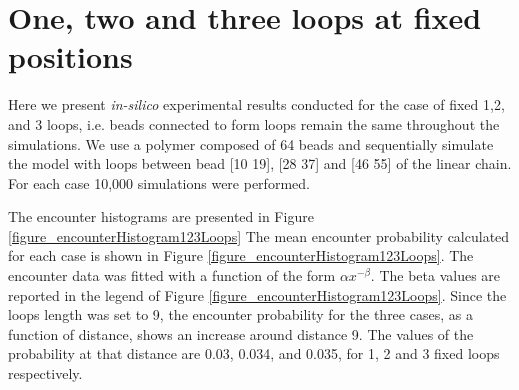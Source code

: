 \documentclass[12pt]{book}
\begin{document}
\section{One, two and three loops at fixed positions}
Here we present \textit{in-silico} experimental results conducted for the case of fixed 1,2, and 3 loops, i.e. beads connected to form loops remain the same throughout the simulations. We use a polymer composed of 64 beads and sequentially simulate the model with loops between bead [10 19], [28 37] and [46 55] of the linear chain. For each case 10,000 simulations were performed.

The encounter histograms are presented in Figure \ref{figure_encounterHistogram123Loops} The mean encounter probability calculated for each case is shown in Figure \ref{figure_encounterHistogram123Loops}. The encounter data was fitted with a function of the form $\alpha x^{-\beta}$. The beta values are reported in the legend of Figure \ref{figure_encounterHistogram123Loops}. Since the loops length was set to 9, the encounter probability for the three cases, as a function of distance, shows an increase around distance 9. The values of the probability at that distance are 0.03, 0.034, and 0.035, for 1, 2 and 3 fixed loops respectively. 
\end{document}
